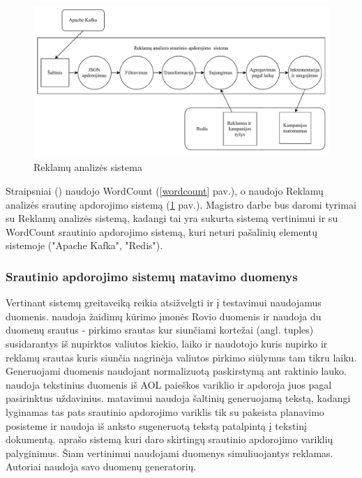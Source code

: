 \documentclass{VUMIFPSbakalaurinis}
\begin{document}
\begin{figure}[H]
    \includegraphics[width=15cm]{img/yahoo.pdf}
    \caption{Reklamų analizės sistema \cite{Chintapalli2016Benchmarking}}
    \label{yahoo}
\end{figure} 

Straipsniai (\cite{Qian2016Benchmarking, huang2010hibench, dhalion}) naudojo WordCount (\ref{wordcount} pav.), o \cite{Chintapalli2016Benchmarking, vaquero2018autotuning} naudojo Reklamų analizės srautinę apdorojimo sistemą (\ref{yahoo} pav.). Magistro darbe bus daromi tyrimai su Reklamų analizės sistemą, kadangi tai yra sukurta sistemą vertinimui ir su WordCount srautinio apdorojimo sistemą, kuri neturi pašalinių elementų sistemoje ("Apache Kafka", "Redis").    

\subsubsection{Srautinio apdorojimo sistemų matavimo duomenys}

Vertinant sistemų greitaveiką reikia atsižvelgti ir į testavimui naudojamus duomenis. \cite{Karimov2018BenchmarkingDS} naudoja žaidimų kūrimo įmonės Rovio duomenis ir naudoja du duomenų srautus - pirkimo srautas kur siunčiami kortežai (angl. tuples) susidarantys iš nupirktos valiutos kiekio, laiko ir naudotojo kuris nupirko ir reklamų srautas kuris siunčia nagrinėja valiutos pirkimo siūlymus tam tikru laiku. Generuojami duomenis naudojant normalizuotą paskirstymą ant raktinio lauko. \cite{Qian2016Benchmarking} naudoja tekstinius duomenis iš AOL paieškos variklio ir apdoroja juos pagal pasirinktus uždavinius. \cite{zhang2020heron} matavimui naudoja šaltinių generuojamą tekstą, kadangi lyginamas tas pats srautinio apdorojimo variklis tik su pakeista planavimo posisteme ir naudoja iš anksto sugeneruotą tekstą patalpintą į tekstinį dokumentą. \cite{Chintapalli2016Benchmarking} aprašo sistemą kuri daro skirtingų srautinio apdorojimo variklių palyginimus. Šiam vertinimui naudojami duomenys simuliuojantys reklamas. Autoriai naudoja savo duomenų generatorių.
\end{document}
